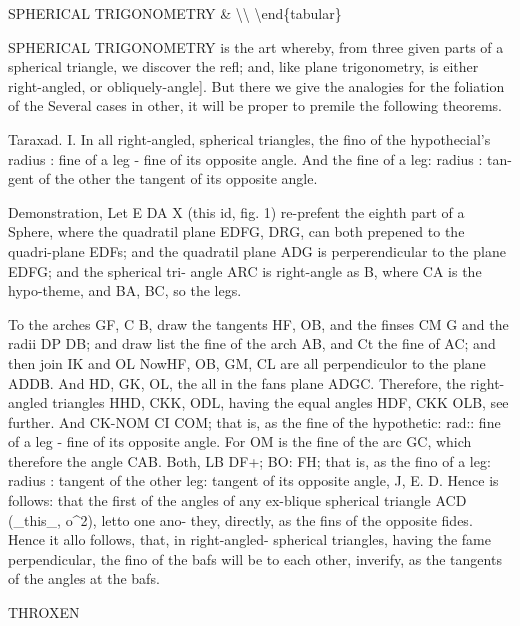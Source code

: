 SPHERICAL TRIGONOMETRY \& \textbackslash{}\textbackslash{}
\textbackslash{}end\{tabular\}\par\medskip
SPHERICAL TRIGONOMETRY is the art whereby, from three given parts of a spherical triangle, we discover the refl; and, like plane trigonometry, is either right-angled, or obliquely-angle]. But there we give the analogies for the foliation of the Several cases in other, it will be proper to premile the following theorems.\par\medskip
Taraxad. I. In all right-angled, spherical triangles, the fino of the hypothecial’s radius : fine of a leg - fine of its opposite angle. And the fine of a leg: radius : tan- gent of the other the tangent of its opposite angle.\par\medskip
Demonstration, Let E DA X (this id, fig. 1) re-prefent the eighth part of a Sphere, where the quadratil plane EDFG, DRG, can both prepened to the quadri-plane EDFs; and the quadratil plane ADG is perperendicular to the plane EDFG; and the spherical tri- angle ARC is right-angle as B, where CA is the hypo-theme, and BA, BC, so the legs.\par\medskip
To the arches GF, C B, draw the tangents HF, OB, and the finses CM G and the radii DP DB; and draw list the fine of the arch AB, and Ct the fine of AC; and then join IK and OL NowHF, OB, GM, CL are all perpendiculor to the plane ADDB. And HD, GK, OL, the all in the fans plane ADGC. Therefore, the right-angled triangles HHD, CKK, ODL, having the equal angles HDF, CKK OLB, see further. And CK-NOM CI COM; that is, as the fine of the hypothetic: rad:: fine of a leg - fine of its opposite angle. For OM is the fine of the arc GC, which therefore the angle CAB. Both, LB DF+; BO: FH; that is, as the fino of a leg: radius : tangent of the other leg: tangent of its opposite angle, J, E. D. Hence is follows: that the first of the angles of any ex-blique spherical triangle ACD (\_this\_, o\textasciicircum{}2), letto one ano- they, directly, as the fins of the opposite fides. Hence it allo follows, that, in right-angled- spherical triangles, having the fame perpendicular, the fino of the bafs will be to each other, inverify, as the tangents of the angles at the bafs.\par\medskip
THROXEN\par\medskip
